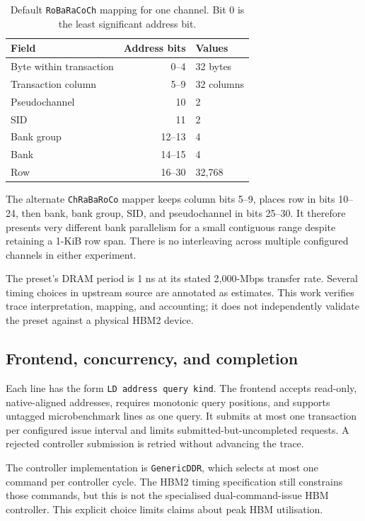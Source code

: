 \documentclass[11pt,a4paper]{report}
\begin{document}
\begin{table}[htbp]\centering
\caption[Default address mapping]{Default \texttt{RoBaRaCoCh} mapping for one channel. Bit 0 is the least significant address bit.}\label{tab:bits}
\begin{tabular}{lrl}\toprule
Field & Address bits & Values\\\midrule
Byte within transaction & 0--4 & 32 bytes\\
Transaction column & 5--9 & 32 columns\\
Pseudochannel & 10 & 2\\
SID & 11 & 2\\
Bank group & 12--13 & 4\\
Bank & 14--15 & 4\\
Row & 16--30 & 32,768\\\bottomrule
\end{tabular}
\end{table}

The alternate \texttt{ChRaBaRoCo} mapper keeps column bits 5--9, places row in bits 10--24, then bank, bank group, SID, and pseudochannel in bits 25--30. It therefore presents very different bank parallelism for a small contiguous range despite retaining a 1-KiB row span. There is no interleaving across multiple configured channels in either experiment.

The preset's DRAM period is 1 ns at its stated 2,000-Mbps transfer rate. Several timing choices in upstream source are annotated as estimates. This work verifies trace interpretation, mapping, and accounting; it does not independently validate the preset against a physical HBM2 device.

\subsection{Frontend, concurrency, and completion}
\label{sec:frontend}
Each line has the form \texttt{LD address query kind}. The frontend accepts read-only, native-aligned addresses, requires monotonic query positions, and supports untagged microbenchmark lines as one query. It submits at most one transaction per configured issue interval and limits submitted-but-uncompleted requests. A rejected controller submission is retried without advancing the trace.

The controller implementation is \texttt{GenericDDR}, which selects at most one command per controller cycle. The HBM2 timing specification still constrains those commands, but this is not the specialised dual-command-issue HBM controller. This explicit choice limits claims about peak HBM utilisation.
\end{document}
